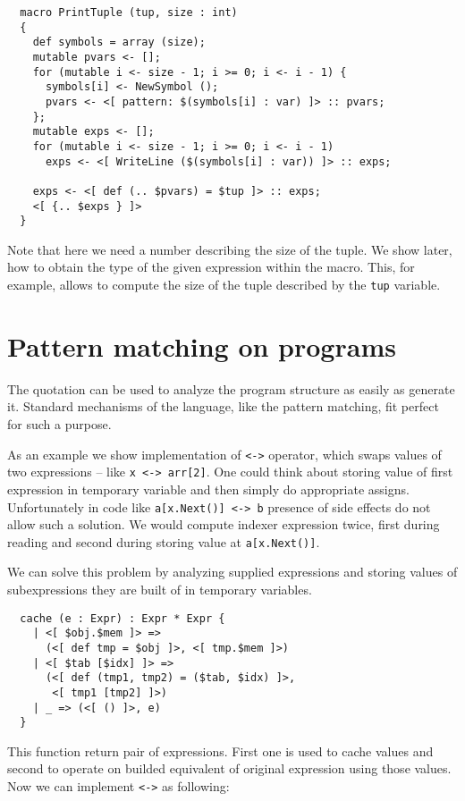 \documentclass{llncs}
\begin{document}
\begin{verbatim}
  macro PrintTuple (tup, size : int)
  {
    def symbols = array (size);
    mutable pvars <- [];
    for (mutable i <- size - 1; i >= 0; i <- i - 1) {
      symbols[i] <- NewSymbol ();
      pvars <- <[ pattern: $(symbols[i] : var) ]> :: pvars;
    };
    mutable exps <- [];
    for (mutable i <- size - 1; i >= 0; i <- i - 1)
      exps <- <[ WriteLine ($(symbols[i] : var)) ]> :: exps;

    exps <- <[ def (.. $pvars) = $tup ]> :: exps;
    <[ {.. $exps } ]>
  }
\end{verbatim} %

Note that here we need a number describing the size of the tuple. We show later, 
how to obtain the type of the given expression within the macro. This, for 
example, allows to compute the size of the tuple described by the \verb,tup, variable.

\section{Pattern matching on programs}
The quotation can be used to analyze the program structure as easily as generate
it. Standard mechanisms of the language, like the pattern matching, fit perfect
for such a purpose. 

As an example we show implementation of \verb,<->, operator, which swaps values
of two expressions -- like \verb,x <-> arr[2],. One could think about storing value of 
first expression in temporary variable and then simply do appropriate assigns.
Unfortunately in code like \verb,a[x.Next()] <-> b, presence of side effects
do not allow such a solution. We would compute indexer expression twice, first
during reading and second during storing value at \verb,a[x.Next()],.

We can solve this problem by analyzing supplied expressions and storing values of
subexpressions they are built of in temporary variables.

\begin{verbatim}
  cache (e : Expr) : Expr * Expr {
    | <[ $obj.$mem ]> =>
      (<[ def tmp = $obj ]>, <[ tmp.$mem ]>)
    | <[ $tab [$idx] ]> =>
      (<[ def (tmp1, tmp2) = ($tab, $idx) ]>, 
       <[ tmp1 [tmp2] ]>)
    | _ => (<[ () ]>, e)
  }
\end{verbatim}

This function return pair of expressions. First one is used to cache values
and second to operate on builded equivalent of original expression using those values.
Now we can implement \verb,<->, as following:
\end{document}
